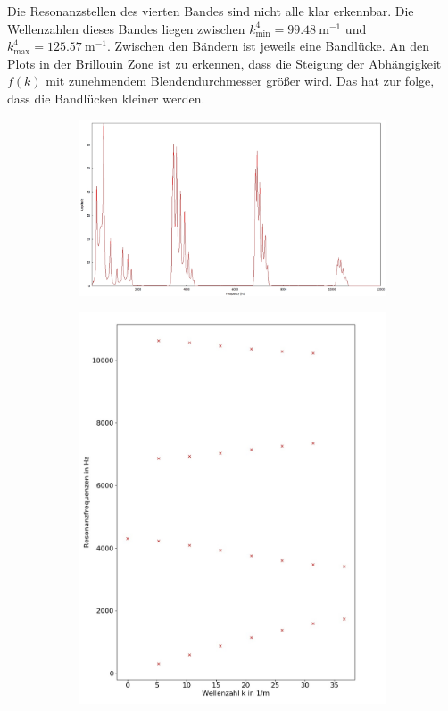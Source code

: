 Die Resonanzstellen des vierten Bandes sind nicht alle klar erkennbar. 
Die Wellenzahlen dieses Bandes liegen zwischen $k^4_\text{min}=99.48~\text{m}^{-1}$ und $k^4_\text{max}=125.57~\text{m}^{-1}$.
Zwischen den Bändern ist jeweils eine Bandlücke.
An den Plots in der Brillouin Zone ist zu erkennen, dass die Steigung der Abhängigkeit $f(k)$ mit zunehmendem Blendendurchmesser größer wird.
Das hat zur folge, dass die Bandlücken kleiner werden.
\begin{figure}
\centering
\begin{subfigure}{0.65\textwidth}
\includegraphics[width=\textwidth]{content/messungen/Chapter4/4_3_10mm.jpg}
\end{subfigure}
\begin{subfigure}{0.34\textwidth}
\includegraphics[width=\textwidth]{content/Scripts/4_3_10_red.jpg}

\end{subfigure}
\end{figure}
